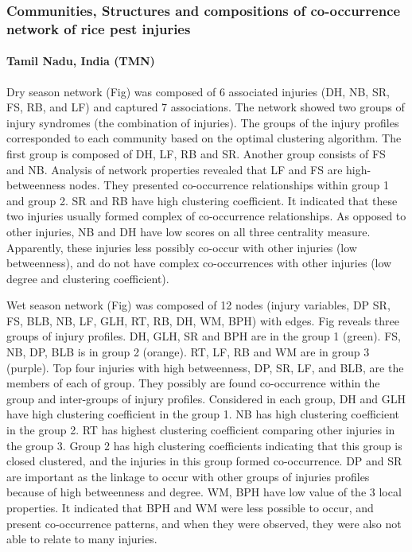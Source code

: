 \subsubsection{Communities, Structures and compositions of co-occurrence network of rice pest injuries}
\paragraph{Tamil Nadu, India (TMN)}

Dry season network (Fig) was composed of 6 associated injuries (DH, NB, SR, FS, RB, and LF) and captured 7 associations. The network showed two groups of injury syndromes (the combination of injuries). The groups of the injury profiles corresponded to each community based on the optimal clustering algorithm. The first group is composed of DH, LF, RB and SR. Another group consists of FS and NB. Analysis of network properties revealed that LF and FS are high-betweenness nodes. They presented co-occurrence relationships within group 1 and group 2. SR and RB have high clustering coefficient. It indicated that these two injuries usually formed complex of co-occurrence relationships. As opposed to other injuries, NB and DH have low scores on all three centrality measure. Apparently, these injuries less possibly co-occur with other injuries (low betweenness), and do not have complex co-occurrences with other injuries (low degree and clustering coefficient).

Wet season network (Fig) was composed of 12 nodes (injury variables, DP SR, FS, BLB, NB, LF, GLH, RT, RB, DH, WM, BPH) with edges. Fig reveals three groups of injury profiles. DH, GLH, SR and BPH are in the group 1 (green).  FS, NB, DP, BLB is in group 2 (orange). RT, LF, RB and WM are in group 3 (purple). Top four injuries with high betweenness, DP, SR, LF, and BLB, are the members of each of group. They possibly are found co-occurrence within the group and inter-groups of injury profiles. Considered in each group, DH and GLH have high clustering coefficient in the group 1. NB has high clustering coefficient in the group 2. RT has highest clustering coefficient comparing other injuries in the group 3.  Group 2 has high clustering coefficients indicating that this group is closed clustered, and the injuries in this group formed co-occurrence.  DP and SR are important as the linkage to occur with other groups of injuries profiles because of high betweenness and degree. WM, BPH have low value of the 3 local properties. It indicated that BPH and WM were less possible to occur, and present co-occurrence patterns, and when they were observed, they were also not able to relate to many injuries. 


